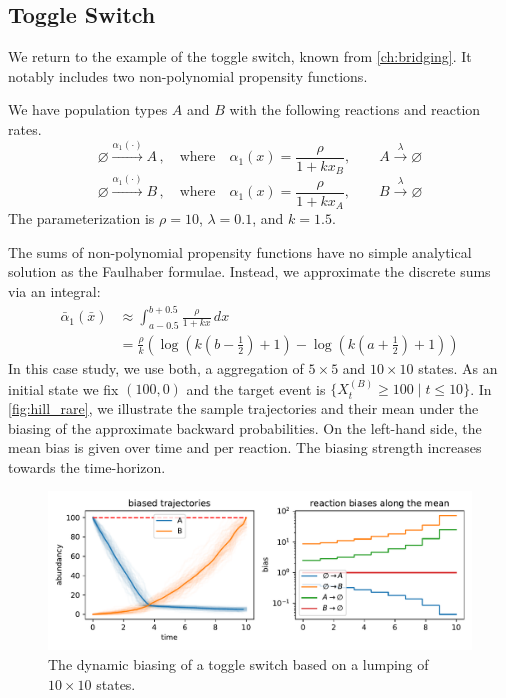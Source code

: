 \subsection{Toggle Switch}
We return to the example of the toggle switch, known from \autoref{ch:bridging}.
It notably includes two non-polynomial propensity functions.
\begin{model}\label{model:hill_toggle_rare}
We have population types $A$ and $B$ with the following reactions and reaction rates.
$$ \varnothing \xrightarrow{\alpha_1(\cdot)} A\,,\quad \text{where}\quad \alpha_1(x) = \frac{\rho}{1 + k x_B},
\qquad A \xrightarrow\lambda \varnothing $$
$$ \varnothing \xrightarrow{\alpha_1(\cdot)} B\,,\quad \text{where}\quad \alpha_1(x) = \frac{\rho}{1 + k x_A},
\qquad B \xrightarrow\lambda \varnothing $$
The parameterization is $\rho=10$, $\lambda=0.1$, and $k=1.5$.
\end{model}
The sums of non-polynomial propensity functions have no simple analytical solution as the Faulhaber formulae.
Instead, we approximate the discrete sums via an integral:
\[
\begin{split}
    \bar{\alpha}_1(\bar{x})&\approx\int_{a-0.5}^{b+0.5} \frac{\rho}{1 + kx}\, dx\\
    &= \frac{\rho}{k} \left(\log{\left(k\left(b - \frac{1}{2}\right) + 1\right)} - \log{\left(k\left(a + \frac{1}{2}\right) + 1 \right)} \right)
\end{split}
\]
In this case study, we use both, a aggregation of $5\times 5$ and $10\times10$ states.
As an initial state we fix $(100, 0)$ and the target event is
\(\{X_t^{(B)} \geq 100 \mid t\leq 10 \}\).
In \autoref{fig:hill_rare}, we illustrate the sample trajectories and their mean under the biasing of the approximate backward probabilities.
On the left-hand side, the mean bias is given over time and per reaction.
The biasing strength increases towards the time-horizon.
\begin{figure}[htb]
    \centering
    \includegraphics[width=\textwidth]{gfx/hill_toggle_is.pdf}
    \caption[Dynamic biasing for the toggle switch]{\label{fig:hill_rare}The dynamic biasing of a toggle switch based on a lumping of $10\times 10$ states.}
\end{figure}
